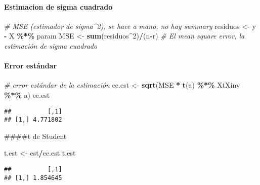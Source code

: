 \documentclass[
]{article}
\newenvironment{Shaded}{\begin{snugshade}}{\end{snugshade}}
\newcommand{\CommentTok}[1]{\textcolor[rgb]{0.56,0.35,0.01}{\textit{#1}}}
\newcommand{\DecValTok}[1]{\textcolor[rgb]{0.00,0.00,0.81}{#1}}
\newcommand{\FunctionTok}[1]{\textcolor[rgb]{0.13,0.29,0.53}{\textbf{#1}}}
\newcommand{\NormalTok}[1]{#1}
\newcommand{\OtherTok}[1]{\textcolor[rgb]{0.56,0.35,0.01}{#1}}
\newcommand{\SpecialCharTok}[1]{\textcolor[rgb]{0.81,0.36,0.00}{\textbf{#1}}}
\begin{document}
\hypertarget{estimacion-de-sigma-cuadrado}{%
\paragraph{Estimacion de sigma
cuadrado}\label{estimacion-de-sigma-cuadrado}}

\begin{Shaded}
\begin{Highlighting}[]
\CommentTok{\# MSE (estimador de sigma\^{}2), se hace a mano, no hay summary}
\NormalTok{residuos }\OtherTok{\textless{}{-}}\NormalTok{ y }\SpecialCharTok{{-}}\NormalTok{ X }\SpecialCharTok{\%*\%}\NormalTok{ param}
\NormalTok{MSE }\OtherTok{\textless{}{-}} \FunctionTok{sum}\NormalTok{(residuos}\SpecialCharTok{\^{}}\DecValTok{2}\NormalTok{)}\SpecialCharTok{/}\NormalTok{(n}\SpecialCharTok{{-}}\NormalTok{r) }\CommentTok{\# El mean square error, la estimación de sigma cuadrado}
\end{Highlighting}
\end{Shaded}

\hypertarget{error-estuxe1ndar-1}{%
\paragraph{Error estándar}\label{error-estuxe1ndar-1}}

\begin{Shaded}
\begin{Highlighting}[]
\CommentTok{\# error estándar de la estimación}
\NormalTok{ee.est }\OtherTok{\textless{}{-}} \FunctionTok{sqrt}\NormalTok{(MSE }\SpecialCharTok{*} \FunctionTok{t}\NormalTok{(a) }\SpecialCharTok{\%*\%}\NormalTok{ XtXinv }\SpecialCharTok{\%*\%}\NormalTok{ a)}
\NormalTok{ee.est}
\end{Highlighting}
\end{Shaded}

\begin{verbatim}
##          [,1]
## [1,] 4.771802
\end{verbatim}

\#\#\#\#t de Student

\begin{Shaded}
\begin{Highlighting}[]
\NormalTok{t.est }\OtherTok{\textless{}{-}}\NormalTok{ est}\SpecialCharTok{/}\NormalTok{ee.est}
\NormalTok{t.est}
\end{Highlighting}
\end{Shaded}

\begin{verbatim}
##          [,1]
## [1,] 1.854645
\end{verbatim}
\end{document}
